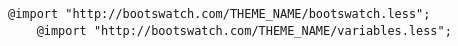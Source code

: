 
\medskip
\begin{lstlisting}[caption= Código genérico para importar \themesCPT de ., label=source:less:generic_bootswatch_theme]
	@import "http://bootswatch.com/THEME_NAME/bootswatch.less";
	@import "http://bootswatch.com/THEME_NAME/variables.less";
\end{lstlisting}